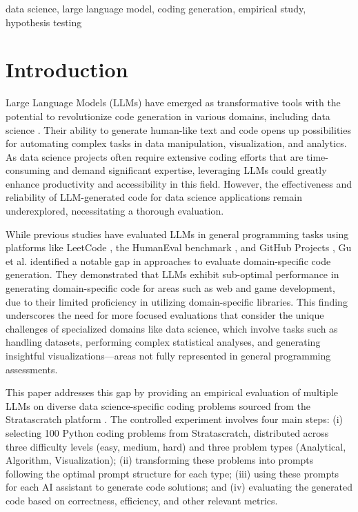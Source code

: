 \documentclass[conference]{IEEEtran}
\begin{document}
\begin{IEEEkeywords}
data science, large language model, coding generation, empirical study, hypothesis testing
\end{IEEEkeywords}

\section{Introduction}

Large Language Models (LLMs) have emerged as transformative tools with the potential to revolutionize code generation in various domains, including data science \cite{halevy2023will, nascimento2023gpt, li2024can, lai2023ds, kazemitabaar2024improving}. Their ability to generate human-like text and code opens up possibilities for automating complex tasks in data manipulation, visualization, and analytics. As data science projects often require extensive coding efforts that are time-consuming and demand significant expertise, leveraging LLMs could greatly enhance productivity and accessibility in this field. However, the effectiveness and reliability of LLM-generated code for data science applications remain underexplored, necessitating a thorough evaluation.


While previous studies have evaluated LLMs in general programming tasks using platforms like LeetCode \cite{nguyen2022empirical, nathalia2023artificial, kuhail2024will, coignion2024performance}, the HumanEval benchmark \cite{chen2021evaluating}, and GitHub Projects \cite{grewal2024analyzing}, Gu et al. \cite{gu2024effectiveness} identified a notable gap in approaches to evaluate domain-specific code generation. They demonstrated that LLMs exhibit sub-optimal performance in generating domain-specific code for areas such as web and game development, due to their limited proficiency in utilizing domain-specific libraries. This finding underscores the need for more focused evaluations that consider the unique challenges of specialized domains like data science, which involve tasks such as handling datasets, performing complex statistical analyses, and generating insightful visualizations—areas not fully represented in general programming assessments.

This paper addresses this gap by providing an empirical evaluation \cite{wohlin2012experimentation} of multiple LLMs on diverse data science-specific coding problems sourced from the Stratascratch platform \cite{stratascratch_master_coding}. The controlled experiment involves four main steps: (i) selecting 100 Python coding problems from Stratascratch, distributed across three difficulty levels (easy, medium, hard) and three problem types (Analytical, Algorithm, Visualization); (ii) transforming these problems into prompts following the optimal prompt structure for each type; (iii) using these prompts for each AI assistant to generate code solutions; and (iv) evaluating the generated code based on correctness, efficiency, and other relevant metrics.
\end{document}
